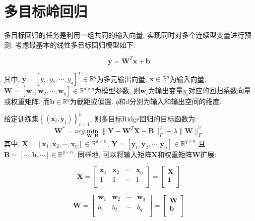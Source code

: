 \documentclass[lang=cn,10pt]{gorgeousnbook}
\numberwithin{equation}{section}%
\numberwithin{figure}{section}%
\begin{document}
\section{多目标岭回归}
多目标回归的任务是利用一组共同的输入向量, 实现同时对多个连续型变量进行预测. 考虑最基本的线性多目标回归模型如下:

 \begin{equation}
\mathbf{y}=\mathbf{W}^T\mathbf{x}+\mathbf{b}
\end{equation}

其中, $\mathbf{y}=\left[ y_1,y_2,\cdots ,y_q \right] ^T\in \mathbb{R}^q$为多元输出向量. $\mathbf{x}\in\mathbb{R}^d$为输入向量, $\mathbf{W}=\left[ \mathbf{w}_1,\mathbf{w}_2,\cdots ,\mathbf{w}_q \right] \in \mathbb{R}^{d\times q}$为模型参数, 则$\mathbf{w}_i$为输出变量$y_i$对应的回归系数向量或权重矩阵.  而$\mathbf{b}\in \mathbb{R}^{q}$为截距或偏置. $q$和$d$分别为输入和输出空间的维度.

给定训练集$\left\{ \left( \mathbf{x}_i,\mathbf{y}_i \right) \right\} _{i=1}^{n}$, 则多目标Ridge回归的目标函数为:
 \begin{equation}
\mathbf{W}^*=arg\min_{\mathbf{W, B}}\lVert \mathbf{Y}-\mathbf{W}^T\mathbf{X}-\mathbf{B} \rVert _{F}^{2}+\lambda \lVert \mathbf{W} \rVert _{F}^{2}
\end{equation}
其中, $\mathbf{X}=\left[ \mathbf{x}_1,\mathbf{x}_2,\cdots ,\mathbf{x}_n \right]\in\mathbb{R}^{d\times n} $, $\mathbf{Y}=\left[ \mathbf{y}_1,\mathbf{y}_2,\cdots ,\mathbf{y}_n \right] \in\mathbb{R}^{q\times n} $ 且 $\mathbf{B}=\left[ \cdots ,\mathbf{b,}\cdots \right] \in \mathbb{R}^{q\times n}$. 同样地, 可以将输入矩阵$\mathbf{X}$和权重矩阵$\mathbf{W}$扩展:

 \begin{equation}
\mathbf{X} =\left[ \begin{matrix}
	\mathbf{x}_{1}&	\mathbf{x}_{2}& \cdots& \mathbf{x}_{n}\\
	1&		1& \cdots& 1\\
\end{matrix} \right]  =\left[ \begin{array}{c}
	\mathbf{X}\\
	\mathbf{1}\\
\end{array} \right] \nonumber
\end{equation}

 \begin{equation}
\mathbf{W}=\left[ \begin{matrix}
	\mathbf{w}_1&		\mathbf{w}_2&		\cdots&		\mathbf{w}_q\\
	b_1&		b_2&		\cdots&		b_q\\
\end{matrix} \right] =\left[ \begin{array}{c}
	\mathbf{W}\\
	\mathbf{b}\\
\end{array} \right]  \nonumber
\end{equation}
\end{document}
